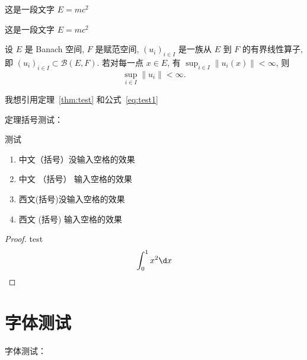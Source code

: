 \begin{lemm}
    这是一段文字 $E = m c^2$
\end{lemm}


\begin{rema}
    这是一段文字 $E = m c^2$
\end{rema}

\begin{theo}\label{thm:test}
    设 $E$ 是 Banach 空间, $F$ 是赋范空间, $(u_i)_{i\in I}$ 是一族从 $E$ 到 $F$ 的有界线性算子,
    即 $(u_i)_{i\in I}\subset \mathcal{B}(E,F)$. 若对每一点 $x\in E$, 有
    $\sup_{i\in I} \|u_i(x)\|<\infty$, 则
    \begin{equation}\label{eq:test1}
        \sup_{i\in I} \|u_i\| < \infty.
    \end{equation}
\end{theo}

我想引用定理~\ref{thm:test} 和公式~\ref{eq:test1}


定理括号测试：

\begin{theo}
    测试
    \begin{enumerate}
        \item 中文（括号）没输入空格的效果
        \item 中文 （括号） 输入空格的效果
        \item 西文(括号)没输入空格的效果
        \item 西文 (括号) 输入空格的效果
    \end{enumerate}
\end{theo}


\begin{proof}
    test
    \[
        \int_{0}^{1} x^2 \d x
    \]
\end{proof}



\section{字体测试}
字体测试：

